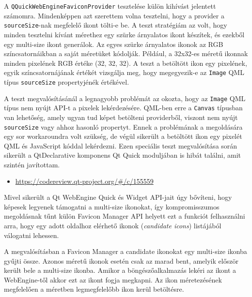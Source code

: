 \documentclass[12pt]{report}
\let\origurl\url
\renewcommand{\url}[1]{%
    \textcolor{blue}{\origurl{#1}}
}
\newcommand{\gerrit}[1]{%
    \textcolor{qtgreen}{\origurl{https://codereview.qt-project.org/\#/c/#1}}
}
\begin{document}
A \texttt{QQuickWebEngineFaviconProvider} tesztelése külön kihívást jelentett számomra.
Mindenképpen azt szerettem volna tesztelni, hogy a provider a \texttt{sourceSize}-nak
megfelelő ikont tölti-e be. A teszt stratégiám az volt, hogy minden tesztelni kívánt mérethez
egy szürke árnyalatos ikont készítek, és ezekből egy multi-size ikont generálok. Az egyes
szürke árnyalatos ikonok az RGB színcsatornáikban a saját méretüket kódolják. Például, a
32x32-es méretű ikonnak minden pixelének RGB értéke (32, 32, 32). A teszt a betöltött ikon
egy pixelének, egyik színcsatornájának értékét vizsgálja meg, hogy megegyezik-e
az \texttt{Image} QML típus \texttt{sourceSize} propertyjénék értékével.

A teszt megvalósításánál a legnagyobb problémát az okozta, hogy az \texttt{Image} QML
típus nem nyújt API-t a pixelek lekérdezésére. QML-ben erre a \texttt{Canvas} típusban
van lehetőség, amely ugyan tud képet betölteni providerből, viszont nem nyújt
\texttt{sourceSize} vagy ahhoz hasonló propertyt. Ennek a problémának a megoldására egy
sor workaroundra volt szükség, de végül sikerült a betöltött ikon egy pixelét QML és
JavaScript kóddal lekérdezni. Ezen speciális teszt megvalósítása során sikerült a
QtDeclarative komponens Qt Quick moduljában is hibát találni, amit szintén javítottam.

\begin{center}
    \begin{reviewbox}
        \begin{itemize}
            \renewcommand{\labelitemi}{\textcolor{qtgreen}{$\blacktriangleright$}}
            \item \gerrit{155559}
        \end{itemize}
    \end{reviewbox}
\end{center}

Mivel sikerült a Qt WebEngine Quick és Widget API-jait úgy bővíteni, hogy képesek legyenek
támogatni a multi-size ikonokat, így kompromisszumos megoldásnak tűnt külön Favicon Manager
API helyett ezt a funkciót felhasználni arra, hogy egy adott oldalhoz elérhető ikonok
(\textit{candidate icons}) listájából válogatni lehessen.

A megvalósításban a Favicon Manager a candidate ikonokat egy multi-size ikonba gyűjti össze.
Azonos méretű ikonok esetén csak az marad bent, amelyik először került bele a multi-size
ikonba. Amikor a böngészőalkalmazás lekéri az ikont a WebEngine-től akkor ezt az ikont
fogja megkapni. Az ikon méretezésének megfelelően a méretben legmegfelelőbb ikon kerül
betöltésre.
\end{document}

